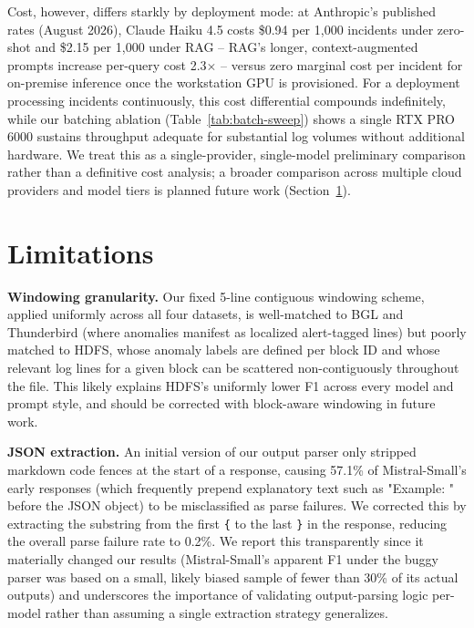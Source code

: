 \documentclass[10pt,conference]{IEEEtran}
\begin{document}
Cost, however, differs starkly by deployment mode: at Anthropic's
published rates (August 2026), Claude Haiku 4.5 costs \$0.94 per 1{,}000
incidents under zero-shot and \$2.15 per 1{,}000 under RAG -- RAG's
longer, context-augmented prompts increase per-query cost 2.3$\times$ --
versus zero marginal cost per incident for on-premise inference once the
workstation GPU is provisioned. For a deployment processing incidents
continuously, this cost differential compounds indefinitely, while our
batching ablation (Table~\ref{tab:batch-sweep}) shows a single RTX PRO
6000 sustains throughput adequate for substantial log volumes without
additional hardware. We treat this as a single-provider, single-model
preliminary comparison rather than a definitive cost analysis; a broader
comparison across multiple cloud providers and model tiers is planned
future work (Section~\ref{sec:limitations}).

\section{Limitations}
\label{sec:limitations}

\textbf{Windowing granularity.} Our fixed 5-line contiguous windowing
scheme, applied uniformly across all four datasets, is well-matched to
BGL and Thunderbird (where anomalies manifest as localized alert-tagged
lines) but poorly matched to HDFS, whose anomaly labels are defined per
block ID and whose relevant log lines for a given block can be scattered
non-contiguously throughout the file. This likely explains HDFS's
uniformly lower F1 across every model and prompt style, and should be
corrected with block-aware windowing in future work.

\textbf{JSON extraction.} An initial version of our output parser only
stripped markdown code fences at the start of a response, causing 57.1\%
of Mistral-Small's early responses (which frequently prepend explanatory
text such as "Example: " before the JSON object) to be misclassified as
parse failures. We corrected this by extracting the substring from the
first \texttt{\{} to the last \texttt{\}} in the response, reducing the
overall parse failure rate to 0.2\%. We report this transparently since
it materially changed our results (Mistral-Small's apparent F1 under the
buggy parser was based on a small, likely biased sample of fewer than 30\%
of its actual outputs) and underscores the importance of validating
output-parsing logic per-model rather than assuming a single extraction
strategy generalizes.
\end{document}
